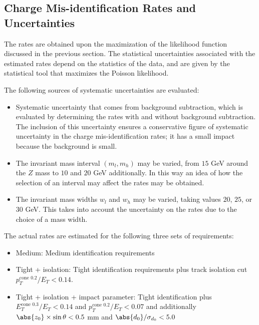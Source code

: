 \subsection{Charge Mis-identification Rates and Uncertainties}

The rates are obtained upon the maximization of the likelihood function
discussed in the previous section. The statistical uncertainties associated
with the estimated rates depend on the statistics of the data, and are given by
the statistical tool that maximizes the Poisson likelihood.

\vspace{3mm}

The following sources of systematic uncertainties are evaluated:

\begin{itemize}[label=]


	\item Systematic uncertainty that comes from background subtraction, which is
	      evaluated by determining the rates with and without background subtraction. The
	      inclusion of this uncertainty ensures a conservative figure of systematic
	      uncertainty in the charge mis-identification rates; it has a small impact
	      because the background is small.


	\item The invariant mass interval $(m_l,m_h)$ may be varied, from $15$ GeV
	      around the $Z$ mass to $10$ and $20$ GeV additionally. In this way an idea of
	      how the selection of an interval may affect the rates may be obtained.


	\item The invariant mass widths $w_l$ and $w_h$ may be varied, taking values
	      $20$, $25$, or $30$ GeV. This takes into account the uncertainty on the rates
	      due to the choice of a mass width.

\end{itemize}

The actual rates are estimated for the following three sets of requirements:

\begin{itemize}[label=]
	\item Medium: Medium identification requirements

	\item Tight + isolation: Tight identification requirements plus track isolation
	      cut $p_T^{\text{cone 0.2}} / E_T < 0.14$.

	\item Tight + isolation + impact parameter: Tight identification plus
	      $E_T^{\text{cone 0.3}} / E_T < 0.14$ and $p_T^{\text{cone 0.2}} / E_T < 0.07$
	      and additionally $\abs{z_0}\times \sin\theta < 0.5$ mm and
	      $\abs{d_0}/\sigma_{d_0} < 5.0$


\end{itemize}

